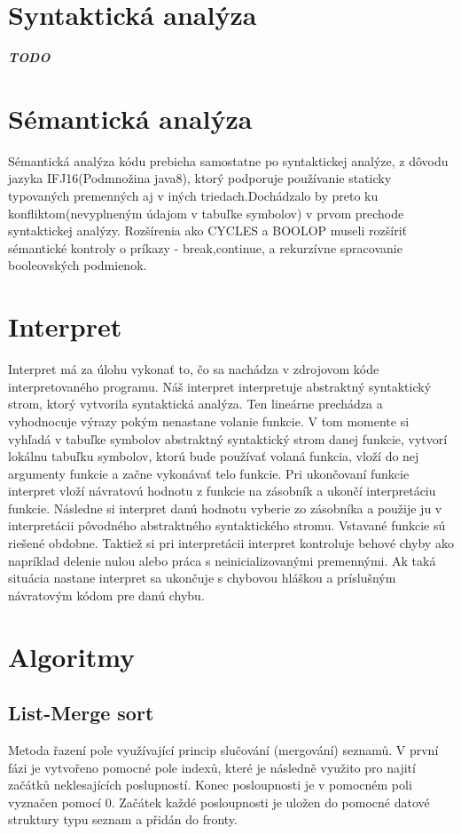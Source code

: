 \documentclass[12pt,a4paper]{report}
\begin{document}
\section{Syntaktická analýza}
\textbf{\textit{TODO}}
\section{Sémantická analýza}
Sémantická analýza kódu prebieha samostatne po syntaktickej analýze, z dôvodu jazyka IFJ16(Podmnožina java8), ktorý podporuje používanie staticky typovaných premenných aj v iných triedach.Dochádzalo by preto ku konfliktom(nevyplneným údajom v tabuľke symbolov) v prvom prechode syntaktickej analýzy. Rozšírenia ako CYCLES a BOOLOP museli rozšíriť sémantické kontroly o príkazy - break,continue, a rekurzívne spracovanie booleovských podmienok.
\section{Interpret}
Interpret má za úlohu vykonať to, čo sa nachádza v zdrojovom kóde interpretovaného programu. Náš interpret interpretuje abstraktný syntaktický strom, ktorý vytvorila syntaktická analýza. Ten lineárne prechádza a vyhodnocuje výrazy pokým nenastane volanie funkcie. V tom momente si vyhľadá v tabuľke symbolov abstraktný syntaktický strom danej funkcie, vytvorí lokálnu tabuľku symbolov, ktorú bude používať volaná funkcia, vloží do nej argumenty funkcie a začne vykonávať telo funkcie. Pri ukončovaní funkcie interpret vloží návratovú hodnotu z funkcie na zásobník a ukončí interpretáciu funkcie. Následne si interpret danú hodnotu vyberie zo zásobníka a použije ju v interpretácii pôvodného abstraktného syntaktického stromu. Vstavané funkcie sú riešené obdobne. Taktiež si pri interpretácii interpret kontroluje behové chyby ako napríklad delenie nulou alebo práca s neinicializovanými premennými. Ak taká situácia nastane interpret sa ukončuje s chybovou hláškou a príslušným návratovým kódom pre danú chybu.


\section{Algoritmy}
\subsection{List-Merge sort}
\par Metoda řazení pole využívající princip slučování (mergování) seznamů.
V první fázi je vytvořeno pomocné pole indexů, které je následně využito pro najití začátků neklesajících poslupností. Konec posloupnosti je v pomocném poli vyznačen pomocí 0. Začátek každé posloupnosti je uložen do pomocné datové struktury typu seznam a přidán do fronty.
\end{document}
